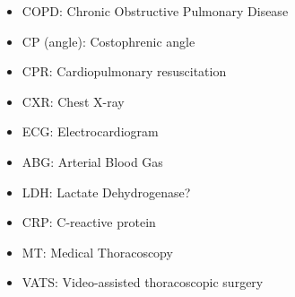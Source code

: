 \begin{itemize}
    \item COPD: Chronic Obstructive Pulmonary Disease
    \item CP (angle): Costophrenic angle
    \item CPR: Cardiopulmonary resuscitation
    \item CXR: Chest X-ray
    \item ECG: Electrocardiogram
    \item ABG: Arterial Blood Gas
    \item LDH: Lactate Dehydrogenase?
    \item CRP: C-reactive protein
    \item MT: Medical Thoracoscopy
    \item VATS: Video-assisted thoracoscopic surgery
\end{itemize}
